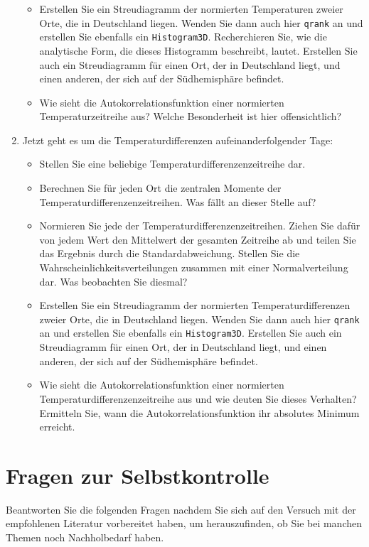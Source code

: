 \documentclass[a4paper,10pt]{article}
\begin{document}
\begin{enumerate}
\begin{itemize}
  \item Erstellen Sie ein Streudiagramm der normierten Temperaturen zweier Orte, die in Deutschland liegen. Wenden Sie dann auch hier \texttt{qrank} an und erstellen Sie ebenfalls ein \texttt{Histogram3D}. Recherchieren Sie, wie die analytische Form, die dieses Histogramm beschreibt, lautet. Erstellen Sie auch ein Streudiagramm für einen Ort, der in Deutschland liegt, und einen anderen, der sich auf der Südhemisphäre befindet.
  \item Wie sieht die Autokorrelationsfunktion einer normierten Temperaturzeitreihe aus? Welche Besonderheit ist hier offensichtlich?
 \end{itemize}
  \item Jetzt geht es um die Temperaturdifferenzen aufeinanderfolgender Tage:
 \begin{itemize}
  \item Stellen Sie eine beliebige Temperaturdifferenzenzeitreihe dar.
  \item Berechnen Sie für jeden Ort die zentralen Momente der Temperaturdifferenzenzeitreihen. Was fällt an dieser Stelle auf?
  \item Normieren Sie jede der Temperaturdifferenzenzeitreihen. Ziehen Sie dafür von jedem Wert den Mittelwert der gesamten Zeitreihe ab und teilen Sie das Ergebnis durch die Standardabweichung. Stellen Sie die Wahrscheinlichkeitsverteilungen zusammen mit einer Normalverteilung dar. Was beobachten Sie diesmal?
  \item Erstellen Sie ein Streudiagramm der normierten Temperaturdifferenzen zweier Orte, die in Deutschland liegen. Wenden Sie dann auch hier \texttt{qrank} an und erstellen Sie ebenfalls ein \texttt{Histogram3D}. Erstellen Sie auch ein Streudiagramm für einen Ort, der in Deutschland liegt, und einen anderen, der sich auf der Südhemisphäre befindet.
  \item Wie sieht die Autokorrelationsfunktion einer normierten Temperaturdifferenzenzeitreihe aus und wie deuten Sie dieses Verhalten? Ermitteln Sie, wann die Autokorrelationsfunktion ihr absolutes Minimum erreicht.
 \end{itemize}
\end{enumerate}

\newpage

\section{Fragen zur Selbstkontrolle}
Beantworten Sie die folgenden Fragen nachdem Sie sich auf den Versuch mit der empfohlenen Literatur vorbereitet haben, um herauszufinden, ob Sie bei manchen Themen noch Nachholbedarf haben. %
\end{document}
